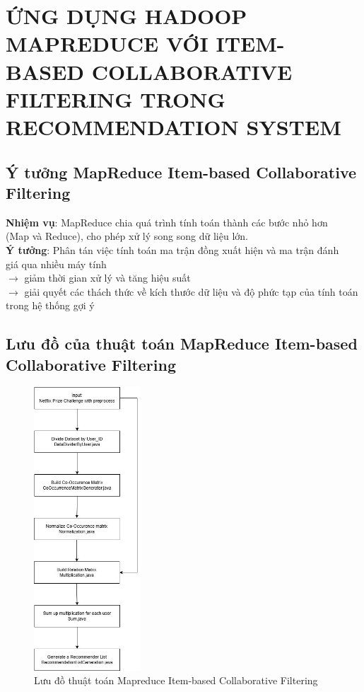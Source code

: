 \chapter[ỨNG DỤNG HADOOP MAPREDUCE VỚI ITEM-BASED COLLABORATIVE FILTERING TRONG RECOMMENDATION SYSTEM]
 {\LARGE ỨNG DỤNG HADOOP MAPREDUCE VỚI ITEM-BASED COLLABORATIVE FILTERING TRONG RECOMMENDATION SYSTEM}

\section{Ý tưởng MapReduce Item-based Collaborative Filtering}
\textbf{Nhiệm vụ}: MapReduce chia quá trình tính toán thành các bước nhỏ hơn \\
\hspace*{2cm}(Map và Reduce), cho phép xử lý song song dữ liệu lớn. \\
\vspace{0.5cm}
\textbf{Ý tưởng}: Phân tán việc tính toán ma trận đồng xuất hiện và ma trận đánh \\
\hspace*{1.7cm}giá qua nhiều máy tính \\
\hspace*{1.7cm}$\rightarrow$ giảm thời gian xử lý và tăng hiệu suất \\
\hspace*{1.7cm}$\rightarrow$ giải quyết các thách thức về kích thước dữ liệu và độ phức tạp của tính toán trong hệ thống gợi ý

\section{Lưu đồ của thuật toán MapReduce Item-based Collaborative Filtering}
\vspace*{-1cm}
\begin{figure}[ht]
    \centering
    \includegraphics[width=4cm]{images/RecommenderSystem.jpg}
    \caption{Lưu đồ thuật toán Mapreduce Item-based Collaborative Filtering}
\end{figure}
